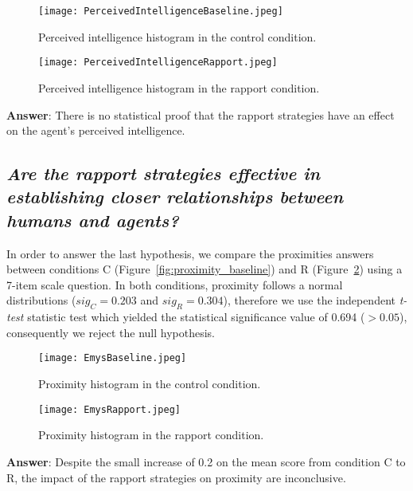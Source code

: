 \begin{figure}[H]
	\centering
	\begin{minipage}[b]{.2\textwidth}
		\centering
		\texttt{[image: PerceivedIntelligenceBaseline.jpeg]}
		\caption{Perceived intelligence histogram in the control condition.}
		\label{fig:intelligence_baseline}
	\end{minipage}
	\hspace{2mm}
	\begin{minipage}[b]{.2\textwidth}
		\centering
		\texttt{[image: PerceivedIntelligenceRapport.jpeg]}
		\caption{Perceived intelligence histogram in the rapport condition.}
		\label{fig:intelligence_rapport}
	\end{minipage}
\end{figure}


\textbf{Answer}: There is no statistical proof that the rapport strategies have an effect on the agent's perceived intelligence.
 
\subsection*{\textit{\textbf{Are the rapport strategies effective in establishing closer relationships between humans and agents?}}}

In order to answer the last hypothesis, we compare the proximities answers between conditions C (Figure~\ref{fig:proximity_baseline}) and R (Figure~\ref{fig:proximity_rapport}) using a 7-item scale question. In both conditions, proximity follows a normal distributions ($sig_C=0.203$ and $sig_R=0.304$), therefore we use the independent \textit{t-test} statistic test which yielded the statistical significance value of 0.694 ($>0.05$), consequently we reject the null hypothesis.

\begin{figure}[ht]
	\centering
	\hspace{5mm}
	\begin{minipage}[b]{.2\textwidth}
		\centering
		\texttt{[image: EmysBaseline.jpeg]}
		\caption{Proximity histogram in the control condition.}
		\label{fig:proximity_baseline}
	\end{minipage}
	\hspace{2mm}
	\begin{minipage}[b]{.2\textwidth}
		\centering
		\texttt{[image: EmysRapport.jpeg]}
		\caption{Proximity histogram in the rapport condition.}
		\label{fig:proximity_rapport}
	\end{minipage}
\end{figure}


\textbf{Answer}: Despite the small increase of 0.2 on the mean score from condition C to R, the impact of the rapport strategies on proximity are inconclusive.
